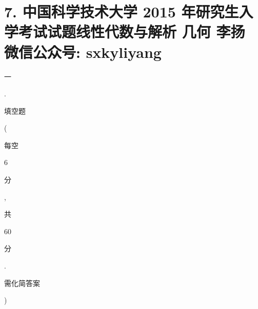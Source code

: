 \documentclass[10pt]{article}
\begin{document}
\section{7. 中国科学技术大学 2015 年研究生入学考试试题线性代数与解析 几何 
 李扬 
 微信公众号: sxkyliyang}
\begin{CJK}{UTF8}{mj}一\end{CJK}. \begin{CJK}{UTF8}{mj}填空题\end{CJK}(\begin{CJK}{UTF8}{mj}每空\end{CJK} 6 \begin{CJK}{UTF8}{mj}分\end{CJK}, \begin{CJK}{UTF8}{mj}共\end{CJK} 60 \begin{CJK}{UTF8}{mj}分\end{CJK}. \begin{CJK}{UTF8}{mj}需化简答案\end{CJK})
\end{document}
